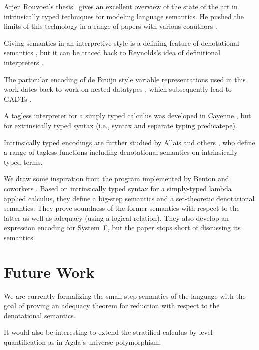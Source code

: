\documentclass[acmsmall,anonymous,review,screen]{acmart}
\begin{document}
Arjen Rouvoet's thesis~\cite{DBLP:phd/basesearch/Rouvoet21} gives an
excellent overview of the state of the art in intrinsically typed
techniques for modeling language semantics. He pushed the limits of
this technology in a range of papers with various coauthors
\cite{DBLP:journals/pacmpl/RestPRVM22,DBLP:journals/pacmpl/RouvoetKV21,DBLP:conf/cpp/RouvoetPKV20,DBLP:journals/pacmpl/PoulsenRTKV18}. 

Giving semantics in an interpretive style is a defining feature of
denotational semantics \cite{Schmidt1986}, but it can be traced back
to Reynolds's idea of definitional interpreters \cite{Reynolds1975}.

The particular encoding of de Bruijn style variable representations
used in this work dates back to work on nested datatypes
\cite{DBLP:conf/mpc/BirdM98,DBLP:journals/jfp/BirdP99,DBLP:conf/csl/AltenkirchR99},
which subsequently lead to GADTs
\cite{cheney03:_first_class_phant_types}.

A tagless interpreter for a simply typed calculus was developed in
Cayenne \cite{augustsson99}, but for extrinsically typed syntax (i.e.,
syntax and separate typing predicatepe).

Intrinsically typed encodings are further studied by Allais and others
\cite{DBLP:conf/cpp/Allais0MM17}, who define a range of tagless
functions including denotational semantics on intrinsically typed
terms. 

We draw some inspiration from the program implemented by Benton and coworkers
\cite{DBLP:journals/jar/BentonHKM12}. Based on intrinsically typed
syntax for a simply-typed lambda applied calculus, they define a
big-step semantics and a set-theoretic denotational semantics. They
prove soundness of the former semantics with respect to the latter as
well as adequacy (using a logical relation). They also develop an
expression encoding for System~F, but the paper stops short of
discussing its semantics. 

\section{Future Work}
\label{sec:future-work}

We are currently formalizing the small-step semantics of the language
with the goal of proving an adequacy theorem for reduction with
respect to the denotational semantics.

It would also be interesting to extend the stratified calculus by
level quantification as in Agda's universe polymorphism.







\end{document}
